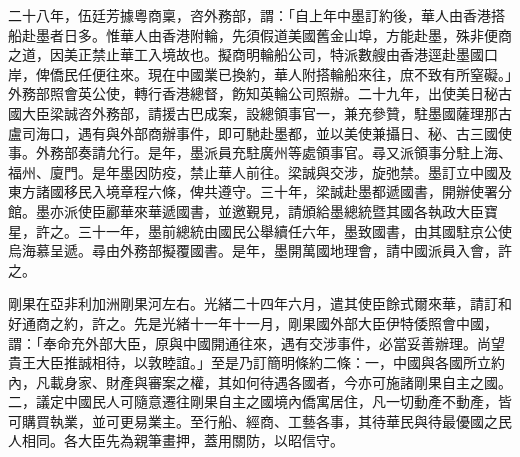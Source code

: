 \begin{pinyinscope}
二十八年，伍廷芳據粵商稟，咨外務部，謂：「自上年中墨訂約後，華人由香港搭船赴墨者日多。惟華人由香港附輪，先須假道美國舊金山埠，方能赴墨，殊非便商之道，因美正禁止華工入境故也。擬商明輪船公司，特派數艘由香港逕赴墨國口岸，俾僑民任便往來。現在中國業已換約，華人附搭輪船來往，庶不致有所窒礙。」外務部照會英公使，轉行香港總督，飭知英輪公司照辦。二十九年，出使美日秘古國大臣梁誠咨外務部，請援古巴成案，設總領事官一，兼充參贊，駐墨國薩理那古盧司海口，遇有與外部商辦事件，即可馳赴墨都，並以美使兼攝日、秘、古三國使事。外務部奏請允行。是年，墨派員充駐廣州等處領事官。尋又派領事分駐上海、福州、廈門。是年墨因防疫，禁止華人前往。梁誠與交涉，旋弛禁。墨訂立中國及東方諸國移民入境章程六條，俾共遵守。三十年，梁誠赴墨都遞國書，開辦使署分館。墨亦派使臣酈華來華遞國書，並邀覲見，請頒給墨總統暨其國各執政大臣寶星，許之。三十一年，墨前總統由國民公舉續任六年，墨致國書，由其國駐京公使烏海慕呈遞。尋由外務部擬覆國書。是年，墨開萬國地理會，請中國派員入會，許之。

剛果在亞非利加洲剛果河左右。光緒二十四年六月，遣其使臣餘式爾來華，請訂和好通商之約，許之。先是光緒十一年十一月，剛果國外部大臣伊特倭照會中國，謂：「奉命充外部大臣，原與中國開通往來，遇有交涉事件，必當妥善辦理。尚望貴王大臣推誠相待，以敦睦誼。」至是乃訂簡明條約二條：一，中國與各國所立約內，凡載身家、財產與審案之權，其如何待遇各國者，今亦可施諸剛果自主之國。二，議定中國民人可隨意遷往剛果自主之國境內僑寓居住，凡一切動產不動產，皆可購買執業，並可更易業主。至行船、經商、工藝各事，其待華民與待最優國之民人相同。各大臣先為親筆畫押，蓋用關防，以昭信守。


\end{pinyinscope}